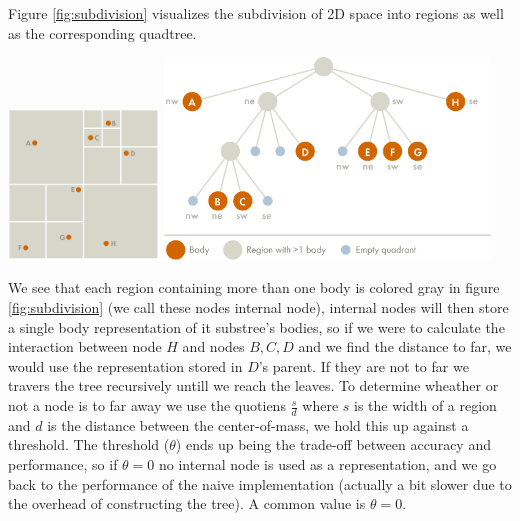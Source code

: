 Figure \ref{fig:subdivision} visualizes the subdivision of 2D space into regions
as well as the corresponding quadtree.
\begin{Figure}
  \centering
  \includegraphics[width=0.30\textwidth]{assests/example-space}
  \includegraphics[width=0.65\textwidth]{assests/example-tree}
  \label{fig:subdivision}
\end{Figure}
We see that each region containing more than one body is colored gray in figure
\ref{fig:subdivision} (we call these nodes internal node), internal nodes will
then store a single body representation of it substree's bodies, so if we were
to calculate the interaction between node
$H$ and nodes $B,C,D$ and we find the distance to far, we would use the
representation stored in $D$'s parent. If they are not to far we travers the tree
recursively untill we reach the leaves. To determine wheather or not a node is to
far away we use the quotiens $\frac{s}{d}$ where $s$ is the width of a region and
$d$ is the distance between the center-of-mass, we hold this up against a threshold.
The threshold ($\theta$) ends up being the trade-off between accuracy and performance,
so if $\theta = 0$ no internal node is used as a representation, and we go back
to the performance of the naive implementation (actually a bit slower due to the
overhead of constructing the tree). A common value is $\theta = 0$.

